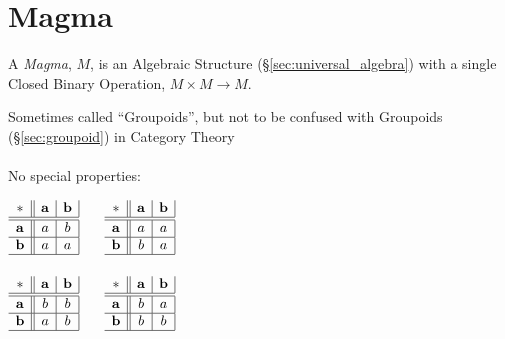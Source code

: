 


\section{Magma}\label{sec:magma}

A \emph{Magma}, $M$, is an Algebraic Structure
(\S\ref{sec:universal_algebra}) with a single Closed Binary Operation,
$M \times M \rightarrow M$.

\fist Sometimes called ``Groupoids'', but not to be confused with Groupoids
(\S\ref{sec:groupoid}) in Category Theory
\\ \\
No special properties:

$\begin{array}{c||c|c|}
  * & \mathbf{a} & \mathbf{b} \\ \hline \hline
  \mathbf{a} & a & b \\ \hline
  \mathbf{b} & a & a \\ \hline
\end{array}$ $\quad$ $\begin{array}{c||c|c|}
  * & \mathbf{a} & \mathbf{b} \\ \hline \hline
  \mathbf{a} & a & a \\ \hline
  \mathbf{b} & b & a \\ \hline
\end{array}$ \\ \hfill \\

$\begin{array}{c||c|c|}
  * & \mathbf{a} & \mathbf{b} \\ \hline \hline
  \mathbf{a} & b & b \\ \hline
  \mathbf{b} & a & b \\ \hline
\end{array}$ $\quad$ $\begin{array}{c||c|c|}
  * & \mathbf{a} & \mathbf{b} \\ \hline \hline
  \mathbf{a} & b & a \\ \hline
  \mathbf{b} & b & b \\ \hline
\end{array}$ \\ \hfill \\

